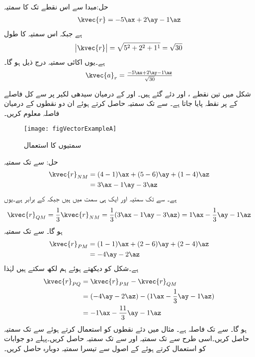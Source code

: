 حل:مبدا سے اس نقطے تک کا سمتیہ
\begin{align*}
\kvec{r}=-5\ax+2\ay-1\az
\end{align*}
ہے جبکہ اس سمتیہ  کا طول
\begin{align*}
\abs{\kvec{r}}=\sqrt{5^2+2^2+1^1}=\sqrt{30}
\end{align*}
 ہے۔یوں اکائی سمتیہ درج ذیل ہو گا۔
\begin{align*}
\kvec{a}_r=\tfrac{-5\ax+2\ay-1\az}{\sqrt{30}}
\end{align*}

شکل  میں تین نقطے ،  اور  دئے گئے ہیں۔ اور  کے درمیان سیدھی لکیر پر  سے کل فاصلے کے   پر نقطہ  پایا جاتا ہے۔ سے  تک سمتیہ حاصل کرتے ہوئے ان دو نقطوں کے درمیان فاصلہ معلوم کریں۔
\begin{figure}
\centering
\texttt{[image: figVectorExampleA]}
\caption{سمتیوں کا استعمال}
\label{شکل_سمتیہ_استعمال_سمتیہ_مثال}
\end{figure}
حل: سے  تک سمتیہ
\begin{align*}
\kvec{r}_{NM}&=(4-1)\ax+(5-6)\ay+(1-4)\az\\
&=3\ax-1\ay-3\az
\end{align*}
ہے۔ سے  تک سمتیہ  اور  ایک ہی سمت میں ہیں جبکہ  کے برابر ہے۔یوں
\begin{align*}
\kvec{r}_{QM}=\frac{1}{3}\kvec{r}_{NM}=\frac{1}{3}(3\ax-1\ay-3\az)=1\ax-\frac{1}{3}\ay-1\az
\end{align*}
ہو گا۔ سے  تک سمتیہ
\begin{align*}
\kvec{r}_{PM}&=(1-1)\ax+(2-6)\ay+(2-4)\az\\
&=-4\ay-2\az
\end{align*}
ہے۔شکل کو دیکھتے ہوئے ہم لکھ سکتے ہیں  لہٰذا
\begin{align*}
\kvec{r}_{PQ}&=\kvec{r}_{PM}-\kvec{r}_{QM}\\
&=(-4\ay-2\az)-(1\ax-\frac{1}{3}\ay-1\az)\\
&=-1\ax-\frac{11}{3}\ay-1\az
\end{align*}
ہو گا۔ سے  تک فاصلہ  ہے۔
مثال  میں دئے نقطوں کو استعمال کرتے ہوئے  سے  تک سمتیہ حاصل کریں۔اسی طرح  سے  تک سمتیہ اور  سے  تک سمتیہ حاصل کریں۔پہلے دو جوابات کو استعمال کرتے ہوئے  کے اصول سے تیسرا سمتیہ دوبارہ حاصل کریں۔

